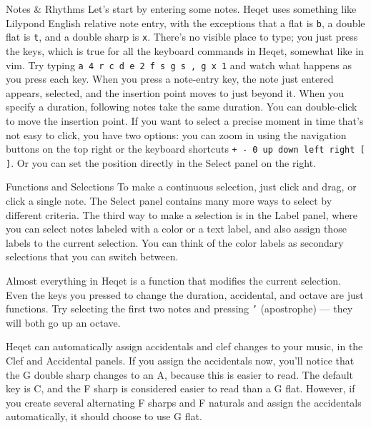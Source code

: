 \documentclass{article}
\begin{document}
\begin{section}{Notes \& Rhythms}
Let's start by entering some notes. Heqet uses something like Lilypond English relative note entry, with the exceptions that a flat is \texttt{b}, a double flat is \texttt{t}, and a double sharp is \texttt{x}. There's no visible place to type; you just press the keys, which is true for all the keyboard commands in Heqet, somewhat like in vim. Try typing \verb+a 4 r c d e 2 f s g s , g x 1+ and watch what happens as you press each key. When you press a note-entry key, the note just entered appears, selected, and the insertion point moves to just beyond it. When you specify a duration, following notes take the same duration. 
You can double-click to move the insertion point. If you want to select a precise moment in time that's not easy to click, you have two options: you can zoom in using the navigation buttons on the top right or the keyboard shortcuts \texttt{+ - 0 up down left right [ ]}. Or you can set the position directly in the Select panel on the right. 
\end{section}

\begin{section}{Functions and Selections}
To make a continuous selection, just click and drag, or click a single note. The Select panel contains many more ways to select by different criteria. The third way to  make a selection is in the Label panel, where you can select notes labeled with a color or a text label, and also assign those labels to the current selection. You can think of the color labels as secondary selections that you can switch between.

Almost everything in Heqet is a function that modifies the current selection. Even the keys you pressed to change the duration, accidental, and octave are just functions. Try selecting the first two notes and pressing \texttt{'} (apostrophe) --- they will both go up an octave. 

Heqet can automatically assign accidentals and clef changes to your music, in the Clef and Accidental panels.  If you assign the accidentals now, you'll notice that the G double sharp changes to an A, because this is easier to read. The default key is C, and the F sharp is considered easier to read than a G flat. However, if you create several alternating F sharps and F naturals and assign the accidentals automatically, it should choose to use G flat.

\end{section}
\end{document}
